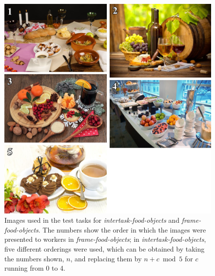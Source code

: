 \documentclass[12pt]{article}
\begin{document}
\begin{figure}
	\begin{center}
	\includegraphics{figs/task1-test.jpg}
	\end{center}
	\caption{
		Images used in the test tasks for \textit{intertask-food-objects}
		and \textit{frame-food-objects}.  
		The numbers show the order in which the 
		images were presented to workers in \textit{frame-food-objects};
		in \textit{intertask-food-objects}, five different orderings were
		used, which can be obtained by taking the numbers shown, $n$,
		and replacing them by $n + c \bmod 5$ for $c$ running from 0 to 4.
	}
	\label{fig:task1:test}
\end{figure}
\end{document}

